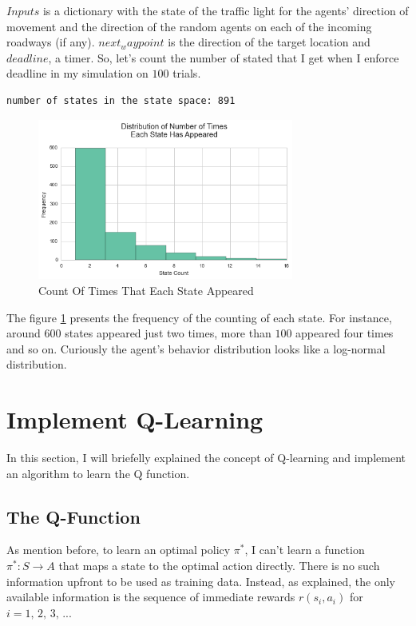\documentclass[a4paper]{article}
\begin{document}
$Inputs$ is a dictionary with the state of the traffic light for the agents' direction of movement and the direction of the random agents on each of the incoming roadways (if any). $next_waypoint$ is the direction of the target location and $deadline$, a timer. So, let's count the number of stated that I get when I enforce deadline in my simulation on $100$ trials.

\begin{lstlisting}
number of states in the state space: 891
\end{lstlisting}

\begin{figure}[ht!]
\centering
\includegraphics[width=0.75\textwidth]{images/basic_agent_behaviour.png}
\caption{\label{fig:hist_basic_agent}Count Of Times That Each State Appeared}
\end{figure}

The figure \ref{fig:hist_basic_agent} presents the frequency of the counting of each state. For instance, around $600$ states appeared just two times, more than $100$ appeared four times and so on. Curiously the agent's behavior distribution looks like a log-normal distribution.


\section{Implement Q-Learning}
\label{sec:implement_q_learning}
In this section, I will briefelly explained the concept of Q-learning and implement an algorithm to learn the Q function.

\subsection{The Q-Function}
As mention before, to learn an optimal policy $\pi^{*}$, I can't learn a function $\pi^{*}: S \rightarrow A$ that maps a state to the optimal action directly. There is no such information upfront to be used as training data. Instead, as \cite{Mitchell} explained, the only available information is the sequence of immediate rewards $r(s_i, a_i)$ for $i=1,\, 2,\, 3,\,...$
\end{document}
